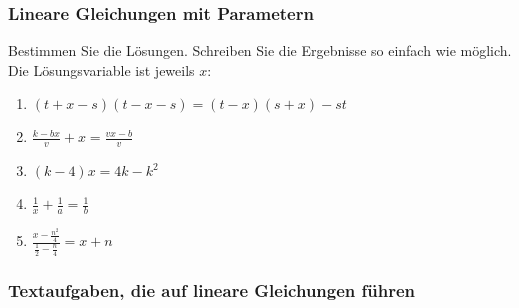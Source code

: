 \subsubsection{Lineare Gleichungen mit Parametern}

Bestimmen Sie die Lösungen. Schreiben Sie die Ergebnisse so einfach
wie möglich. Die Lösungsvariable ist jeweils $x$:

\begin{enumerate}[label=\alph*)]
\item $(t+x-s)(t-x-s) = (t-x)(s+x) - st$
\item $\frac{k-bx}{v} + x = \frac{vx-b}{v}$
\item $(k-4)x = 4k - k^2$
\item $\frac{1}{x} + \frac{1}{a} = \frac{1}{b}$
  \item $\frac{x- \frac{n^2}{4}}{\frac{1}{2} - \frac{n}{4}} = x+n$

\end{enumerate}

\subsubsection{Textaufgaben, die auf lineare Gleichungen führen}

